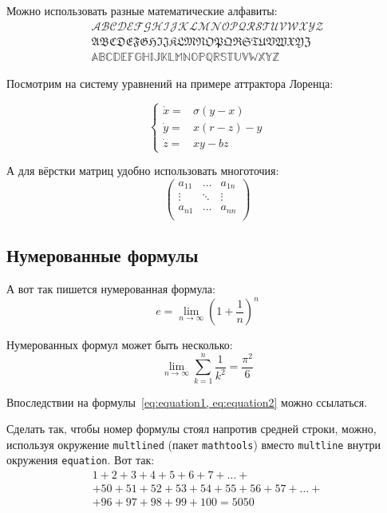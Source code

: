 Можно использовать разные математические алфавиты:
\begin{align}
    \mathcal{ABCDEFGHIJKLMNOPQRSTUVWXYZ} \nonumber  \\
    \mathfrak{ABCDEFGHIJKLMNOPQRSTUVWXYZ} \nonumber \\
    \mathbb{ABCDEFGHIJKLMNOPQRSTUVWXYZ} \nonumber
\end{align}

Посмотрим на систему уравнений на примере аттрактора Лоренца:

\[
\left\{
\begin{array}{rl}
    \dot x = & \sigma (y-x)  \\
    \dot y = & x (r - z) - y \\
    \dot z = & xy - bz
\end{array}
\right.
\]

А для вёрстки матриц удобно использовать многоточия:
\[
    \left(
        \begin{array}{ccc}
            a_{11} & \ldots & a_{1n} \\
            \vdots & \ddots & \vdots \\
            a_{n1} & \ldots & a_{nn} \\
        \end{array}
    \right)
\]

\subsection{Нумерованные формулы}\label{subsec:ch1/sec3/sub3}

А вот так пишется нумерованная формула:
\begin{equation}
    \label{eq:equation1}
    e = \lim_{n \to \infty} \left( 1+\frac{1}{n} \right) ^n
\end{equation}

Нумерованных формул может быть несколько:
\begin{equation}
    \label{eq:equation2}
    \lim_{n \to \infty} \sum_{k=1}^n \frac{1}{k^2} = \frac{\pi^2}{6}
\end{equation}

Впоследствии на формулы~\cref{eq:equation1, eq:equation2} можно ссылаться.

Сделать так, чтобы номер формулы стоял напротив средней строки, можно,
используя окружение \verb|multlined| (пакет \verb|mathtools|) вместо
\verb|multline| внутри окружения \verb|equation|. Вот так:
\begin{equation} %
    \label{eq:equation3}
    \begin{multlined}
        1+ 2+3+4+5+6+7+\dots + \\
        + 50+51+52+53+54+55+56+57 + \dots + \\
        + 96+97+98+99+100=5050
    \end{multlined}
\end{equation}

